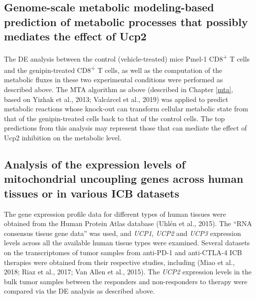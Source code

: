 \documentclass[12pt,twoside,openany,\mydriver]{thesis}  %
\begin{document}
\hypertarget{genome-scale-metabolic-modeling-based-prediction-of-metabolic-processes-that-possibly-mediates-the-effect-of-ucp2}{%
\subsection{Genome-scale metabolic modeling-based prediction of metabolic processes that possibly mediates the effect of Ucp2}\label{genome-scale-metabolic-modeling-based-prediction-of-metabolic-processes-that-possibly-mediates-the-effect-of-ucp2}}

The DE analysis between the control (vehicle-treated) mice Pmel-1 CD8\textsuperscript{+} T cells and the genipin-treated CD8\textsuperscript{+} T cells, as well as the computation of the metabolic fluxes in these two experimental conditions were performed as described above. The MTA algorithm as above (described in Chapter \ref{mta}, based on Yizhak et al., 2013; Valcárcel et al., 2019) was applied to predict metabolic reactions whose knock-out can transform cellular metabolic state from that of the genipin-treated cells back to that of the control cells. The top predictions from this analysis may represent those that can mediate the effect of Ucp2 inhibition on the metabolic level.

\hypertarget{analysis-of-the-expression-levels-of-mitochondrial-uncoupling-genes-across-human-tissues-or-in-various-icb-datasets}{%
\subsection{Analysis of the expression levels of mitochondrial uncoupling genes across human tissues or in various ICB datasets}\label{analysis-of-the-expression-levels-of-mitochondrial-uncoupling-genes-across-human-tissues-or-in-various-icb-datasets}}

The gene expression profile data for different types of human tissues were obtained from the Human Protein Atlas database (Uhlén et al., 2015). The ``RNA consensus tissue gene data'' was used, and \emph{UCP1}, \emph{UCP2} and \emph{UCP3} expression levels across all the available human tissue types were examined. Several datasets on the transcriptomes of tumor samples from anti-PD-1 and anti-CTLA-4 ICB therapies were obtained from their respective studies, including (Miao et al., 2018; Riaz et al., 2017; Van Allen et al., 2015). The \emph{UCP2} expression levels in the bulk tumor samples between the responders and non-responders to therapy were compared via the DE analysis as described above.
\end{document}
